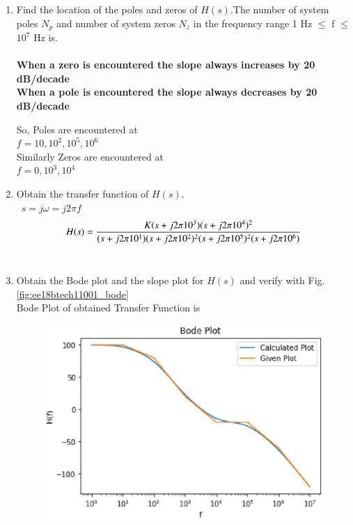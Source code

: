 \begin{enumerate}[label=\thesection.\arabic*.,ref=\thesection.\theenumi]
\item Find the location of the poles and zeros of $H(s).$The number of system poles $N_{p}$ and number of system zeros $N_{z}$ in the frequency range 1 Hz $\leq$ f $\leq$ $10^{7}$ Hz is.
\\
\solution\\
\textbf{When a zero is encountered the slope always increases by 20 dB/decade}\\
\textbf{When a pole is encountered the slope always decreases by 20 dB/decade}

So, Poles are encountered at\\ $f = 10,10^2,10^5,10^6$\\
Similarly Zeros are encountered at\\ $f = 0,10^3,10^4$


\item Obtain the transfer function of $H(s)$.
\\
\solution\
$ s = j\omega = j2\pi f$
\begin{align}
\begin{small}
	H(s) = \dfrac{K(s+j2\pi 10^{3})(s+j2\pi 10^{4})^{2}}{(s+j2\pi 10^{1})(s+j2\pi 10^{2})^{2}(s+j2\pi 10^{5})^{2}(s+j2\pi 10^{6})}
\end{small}
\end{align}\\


\item Obtain the Bode plot and the slope plot for $H(s)$ and verify with  Fig. \ref{fig:ee18btech11001_bode}
\\
\solution
Bode Plot of obtained Transfer Function is 
\begin{figure}[htp]
    \centering
    \includegraphics[width=\columnwidth]{./figs/ee18btech11001_2.eps}
    \caption{}
    \label{fig:bode}
\end{figure}

\end{enumerate}

